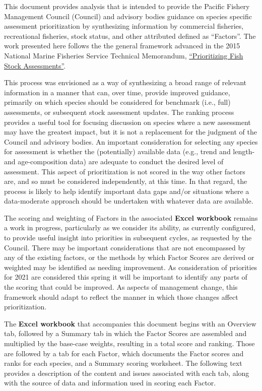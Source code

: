 \documentclass[12pt,]{article}
\begin{document}
This document provides analysis that is intended to provide the Pacific
Fishery Management Council (Council) and advisory bodies guidance on
species specific assessment prioritization by synthesizing information
by commercial fisheries, recreational fisheries, stock status, and other
attributed defined as ``Factors''. The work presented here follows the
the general framework advanced in the 2015 National Marine Fisheries
Service Technical Memorandum,
\href{https://www.st.nmfs.noaa.gov/Assets/stock/documents/PrioritizingFishStockAssessments_FinalWeb.pdf}{``Prioritizing
Fish Stock Assessments''}.

This process was envisioned as a way of synthesizing a broad range of
relevant information in a manner that can, over time, provide improved
guidance, primarily on which species should be considered for benchmark
(i.e., full) assessments, or subsequent stock assessment updates. The
ranking process provides a useful tool for focusing discussion on
species where a new assessment may have the greatest impact, but it is
not a replacement for the judgment of the Council and advisory bodies.
An important consideration for selecting any species for assessment is
whether the (potentially) available data (e.g., trend and length- and
age-composition data) are adequate to conduct the desired level of
assessment. This aspect of prioritization is not scored in the way other
factors are, and so must be considered independently, at this time. In
that regard, the process is likely to help identify important data gaps
and/or situations where a data-moderate approach should be undertaken
with whatever data are available.

The scoring and weighting of Factors in the associated \textbf{Excel
workbook} remains a work in progress, particularly as we consider its
ability, as currently configured, to provide useful insight into
priorities in subsequent cycles, as requested by the Council. There may
be important considerations that are not encompassed by any of the
existing factors, or the methods by which Factor Scores are derived or
weighted may be identified as needing improvement. As consideration of
priorities for 2021 are considered this spring it will be important to
identify any parts of the scoring that could be improved. As aspects of
management change, this framework should adapt to reflect the manner in
which those changes affect prioritization.

The \textbf{Excel workbook} that accompanies this document begins with
an Overview tab, followed by a Summary tab in which the Factor Scores
are assembled and multiplied by the base-case weights, resulting in a
total score and ranking. Those are followed by a tab for each Factor,
which documents the Factor scores and ranks for each species, and a
Summary scoring worksheet. The following text provides a description of
the content and issues associated with each tab, along with the source
of data and information used in scoring each Factor.
\end{document}
